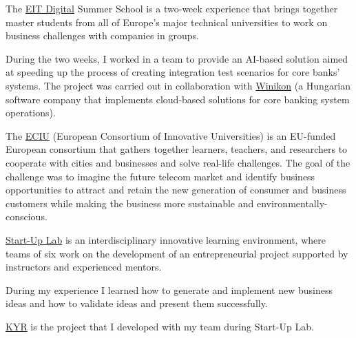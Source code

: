 \documentclass[10pt,a4paper]{altacv}
\begin{document}
The \href{https://www.eitdigital.eu/}{EIT Digital} Summer School is a two-week experience that brings together master students from all of Europe's major technical universities to work on business challenges with companies in groups.

During the two weeks, I worked in a team to provide an AI-based solution aimed at speeding up the process of creating integration test scenarios for core banks' systems. The project was carried out in collaboration with \href{https://winikon.io/}{Winikon} (a Hungarian software company that implements cloud-based solutions for core banking system operations).
\medskip
\medskip

The \href{https://www.eciu.org/}{ECIU} (European Consortium of Innovative Universities) is an EU-funded European consortium that gathers together learners, teachers, and researchers to cooperate with cities and businesses and solve real-life challenges.
The goal of the challenge was to imagine the future telecom market and identify business opportunities to attract and retain the new generation of consumer and business customers while making the business more sustainable and environmentally-conscious.
\medskip
\medskip 

\href{https://clabtrento.it/en/engage/start-up-lab}{Start-Up Lab} is an interdisciplinary innovative learning environment, where teams of six work on the development of an entrepreneurial project supported by instructors and experienced mentors.

During my experience I learned how to generate and implement new business ideas and how to validate ideas and present them successfully.

\href{https://linktr.ee/kyrmusic}{KYR} is the project that I developed with my team during Start-Up Lab.
\medskip
\medskip
\end{document}
